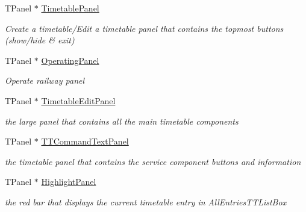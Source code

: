 \begin{DoxyCompactItemize}
\mbox{\label{class_t_interface_aa0dce121f2c0feba11e8bda29cb16a97}} 
T\+Panel $\ast$ \mbox{\hyperlink{class_t_interface_aa0dce121f2c0feba11e8bda29cb16a97}{Timetable\+Panel}}
\begin{DoxyCompactList}\small\item\em \textquotesingle{}Create a timetable\textquotesingle{}/\textquotesingle{}Edit a timetable\textquotesingle{} panel that contains the topmost buttons (show/hide \& exit) \end{DoxyCompactList}\item 
\mbox{\label{class_t_interface_a9037b5b7dd4a95e2cc9b4c64ee97b015}} 
T\+Panel $\ast$ \mbox{\hyperlink{class_t_interface_a9037b5b7dd4a95e2cc9b4c64ee97b015}{Operating\+Panel}}
\begin{DoxyCompactList}\small\item\em \textquotesingle{}Operate railway\textquotesingle{} panel \end{DoxyCompactList}\item 
\mbox{\label{class_t_interface_a99b9c15c11d2620c255966f62b2b9226}} 
T\+Panel $\ast$ \mbox{\hyperlink{class_t_interface_a99b9c15c11d2620c255966f62b2b9226}{Timetable\+Edit\+Panel}}
\begin{DoxyCompactList}\small\item\em the large panel that contains all the main timetable components \end{DoxyCompactList}\item 
\mbox{\label{class_t_interface_a56dc400de815cde20ab164f65d4a57e8}} 
T\+Panel $\ast$ \mbox{\hyperlink{class_t_interface_a56dc400de815cde20ab164f65d4a57e8}{T\+T\+Command\+Text\+Panel}}
\begin{DoxyCompactList}\small\item\em the timetable panel that contains the service component buttons and information \end{DoxyCompactList}\item 
\mbox{\label{class_t_interface_abd2c189b2bb0ca543d7fcd3082ddcddb}} 
T\+Panel $\ast$ \mbox{\hyperlink{class_t_interface_abd2c189b2bb0ca543d7fcd3082ddcddb}{Highlight\+Panel}}
\begin{DoxyCompactList}\small\item\em the red bar that displays the current timetable entry in All\+Entries\+T\+T\+List\+Box \end{DoxyCompactList}\item 

\end{DoxyCompactItemize}
